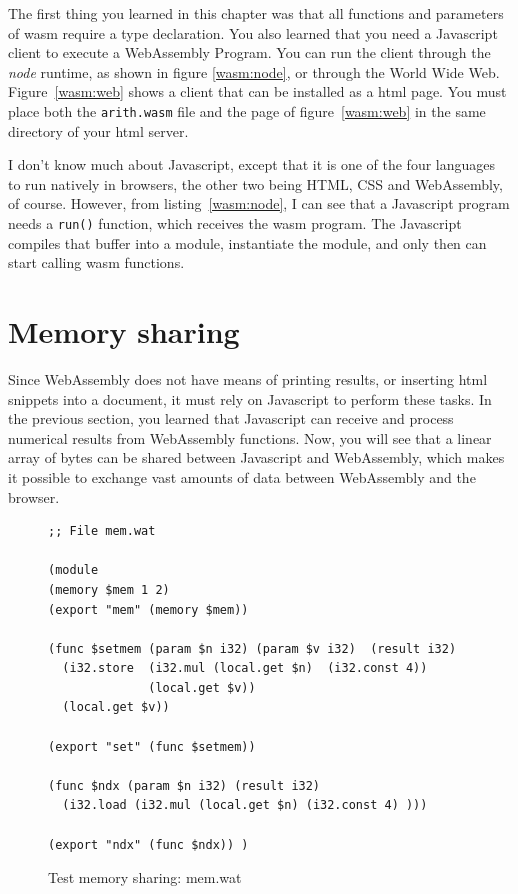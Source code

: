 \documentclass[a4paper,12pt]{book}
\begin{document}
The first thing you learned in this
chapter was that all functions and parameters
of wasm require a type declaration. You also 
learned that you need a Javascript client
to execute a WebAssembly Program. You can run
the client through the {\em node} runtime, as
shown in figure \ref{wasm:node}, or through the
World Wide Web. Figure~\ref{wasm:web} shows
a client that can be installed as a html page.
You must place both the \verb|arith.wasm| file
and the page of figure~\ref{wasm:web} in the same
directory of your html server.

I don't know much about Javascript, except that
it is one of the four languages to run natively
in browsers, the other two being HTML, CSS and
WebAssembly, of course. However, from
listing~\ref{wasm:node}, I can see that
a Javascript program needs a \verb|run()|
function, which receives the wasm program.
The Javascript compiles that buffer into a module,
instantiate the module, and only then can start
calling wasm functions.


\section{Memory sharing}
Since WebAssembly does not have means of printing results,
or inserting html snippets into a document, it must rely
on Javascript to perform these tasks. In the previous section,
you learned that Javascript can receive and process
numerical results from WebAssembly functions. Now, you will
see that a linear array of bytes can be shared between
Javascript and WebAssembly, which makes it possible
to exchange vast amounts of data between WebAssembly
and the browser.


\begin{figure}[!h]
\begin{verbatim}
;; File mem.wat

(module
(memory $mem 1 2)
(export "mem" (memory $mem))

(func $setmem (param $n i32) (param $v i32)  (result i32)
  (i32.store  (i32.mul (local.get $n)  (i32.const 4))
              (local.get $v))
  (local.get $v))
  
(export "set" (func $setmem))

(func $ndx (param $n i32) (result i32)
  (i32.load (i32.mul (local.get $n) (i32.const 4) )))
  
(export "ndx" (func $ndx)) )
\end{verbatim}
  \caption{Test memory sharing: mem.wat}
  \label{wasm:memsharing}
\end{figure}
\end{document}
